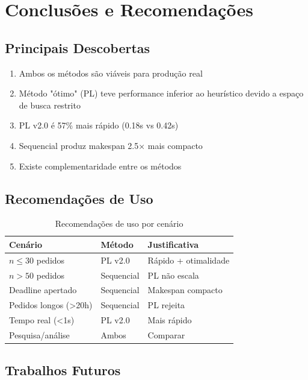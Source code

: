 \documentclass[12pt,a4paper]{article}
\theoremstyle{definition}
\begin{document}
\section{Conclusões e Recomendações}

\subsection{Principais Descobertas}

\begin{enumerate}
    \item Ambos os métodos são viáveis para produção real
    \item Método "ótimo" (PL) teve performance inferior ao heurístico devido a espaço de busca restrito
    \item PL v2.0 é 57\% mais rápido (0.18s vs 0.42s)
    \item Sequencial produz makespan 2.5× mais compacto
    \item Existe complementaridade entre os métodos
\end{enumerate}

\subsection{Recomendações de Uso}

\begin{table}[H]
\centering
\small
\begin{tabular}{@{}lll@{}}
\toprule
\textbf{Cenário} & \textbf{Método} & \textbf{Justificativa} \\
\midrule
$n \leq 30$ pedidos & PL v2.0 & Rápido + otimalidade \\
$n > 50$ pedidos & Sequencial & PL não escala \\
Deadline apertado & Sequencial & Makespan compacto \\
Pedidos longos (>20h) & Sequencial & PL rejeita \\
Tempo real (<1s) & PL v2.0 & Mais rápido \\
Pesquisa/análise & Ambos & Comparar \\
\bottomrule
\end{tabular}
\caption{Recomendações de uso por cenário}
\label{tab:recomendacoes}
\end{table}

\subsection{Trabalhos Futuros}
\end{document}
